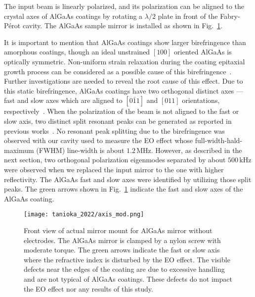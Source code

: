 The input beam is linearly polarized, and its polarization can be aligned to the crystal axes of AlGaAs coatings by rotating a $\lambda/2$ plate in front of the Fabry-P\'erot cavity.
The AlGaAs sample mirror is installed as shown in Fig.~\ref{fig.mount}.

It is important to mention that AlGaAs coatings show larger birefringence than amorphous coatings, though an ideal unstrained $[100]$ oriented AlGaAs is optically symmetric.
Non-uniform strain relaxation during the coating epitaxial growth process can be considered as a possible cause of this birefringence~\cite{Buckle2018}.
Further investigations are needed to reveal the root cause of this effect.
Due to this static birefringence, AlGaAs coatings have two orthogonal distinct axes --- fast and slow axes which are aligned to $[0\bar{1}1]$ and $[011]$ orientations, respectively~\cite{thorlabs,Winkler2021}.
When the polarization of the beam is not aligned to the fast or slow axis, two distinct split resonant peaks can be generated as reported in previous works~\cite{cole:2013, cole:2016}.
No resonant peak splitting due to the birefringence was observed with our cavity used to measure the EO effect whose full-width-hald-maximum (FWHM) line-width is about $1.2\, \mathrm{MHz}$.
However, as described in the next section, two orthogonal polarization eigenmodes separated by about $500\, \mathrm{kHz}$ were observed when we replaced the input mirror to the one with higher reflectivity.
The AlGaAs fast and slow axes were identified by utilizing those split peaks.
The green arrows shown in Fig.~\ref{fig.mount} indicate the fast and slow axes of the AlGaAs coating.



\begin{figure}[htbp]
    \centering
\texttt{[image: tanioka\_2022/axis\_mod.png]}
\caption{
Front view of actual mirror mount for AlGaAs mirror without electrodes.
The AlGaAs mirror is clamped by a nylon screw with moderate torque.
The green arrows indicate the fast or slow axis where the refractive index is disturbed by the EO effect. The visible defects near the edges of the coating are due to excessive handling and are not typical of AlGaAs coatings. These defects do not impact the EO effect nor any results of this study.
}
\label{fig.mount}
\end{figure}

